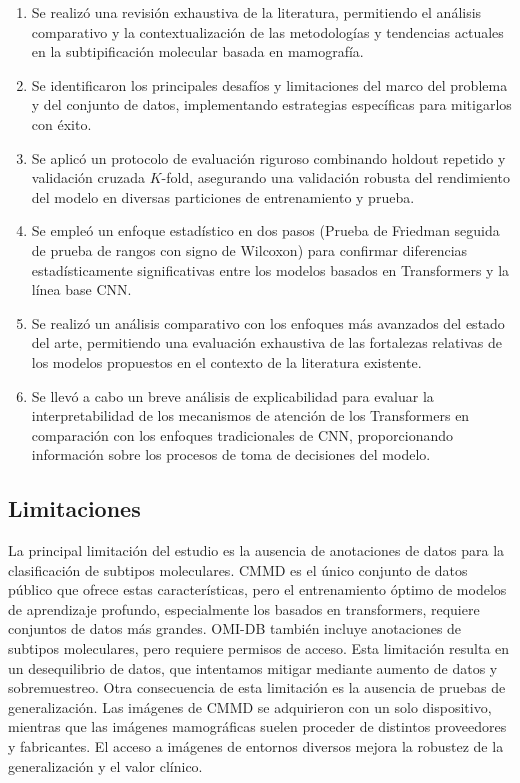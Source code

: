 \documentclass[a4paper,10pt]{book}
\begin{document}
\begin{enumerate}[label=\Roman*.]
\item Se realizó una revisión exhaustiva de la literatura, permitiendo el análisis comparativo y la contextualización de las metodologías y tendencias actuales en la subtipificación molecular basada en mamografía.

\item Se identificaron los principales desafíos y limitaciones del marco del problema y del conjunto de datos, implementando estrategias específicas para mitigarlos con éxito.

\item Se aplicó un protocolo de evaluación riguroso combinando holdout repetido y validación cruzada $K$-fold, asegurando una validación robusta del rendimiento del modelo en diversas particiones de entrenamiento y prueba.

\item Se empleó un enfoque estadístico en dos pasos (Prueba de Friedman seguida de prueba de rangos con signo de Wilcoxon) para confirmar diferencias estadísticamente significativas entre los modelos basados en Transformers y la línea base CNN.

\item Se realizó un análisis comparativo con los enfoques más avanzados del estado del arte, permitiendo una evaluación exhaustiva de las fortalezas relativas de los modelos propuestos en el contexto de la literatura existente.

\item Se llevó a cabo un breve análisis de explicabilidad para evaluar la interpretabilidad de los mecanismos de atención de los Transformers en comparación con los enfoques tradicionales de CNN, proporcionando información sobre los procesos de toma de decisiones del modelo.
\end{enumerate}

\subsection{Limitaciones}

La principal limitación del estudio es la ausencia de anotaciones de datos para la clasificación de subtipos moleculares. CMMD es el único conjunto de datos público que ofrece estas características, pero el entrenamiento óptimo de modelos de aprendizaje profundo, especialmente los basados en transformers, requiere conjuntos de datos más grandes. OMI-DB también incluye anotaciones de subtipos moleculares, pero requiere permisos de acceso. Esta limitación resulta en un desequilibrio de datos, que intentamos mitigar mediante aumento de datos y sobremuestreo. Otra consecuencia de esta limitación es la ausencia de pruebas de generalización. Las imágenes de CMMD se adquirieron con un solo dispositivo, mientras que las imágenes mamográficas suelen proceder de distintos proveedores y fabricantes. El acceso a imágenes de entornos diversos mejora la robustez de la generalización y el valor clínico.
\end{document}
